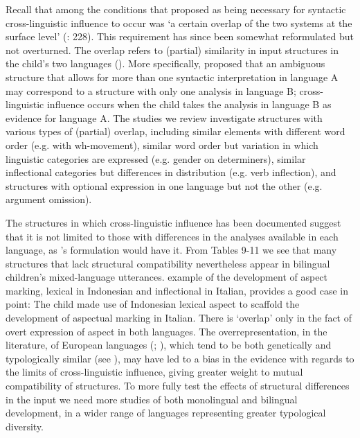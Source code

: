 \documentclass[output=paper]{langscibook}
\begin{document}
Recall that among the conditions that \citeauthor{HulkMüller2000} proposed as being necessary for syntactic cross-linguistic influence to occur was ‘a certain overlap of the two systems at the surface level’ (\citeyear{HulkMüller2000}: 228). This requirement has since been somewhat reformulated but not overturned. The overlap refers to (partial) similarity in input structures in the child’s two languages (\citealt{Unsworth2003}). More specifically, \citeauthor{HulkMüller2000} proposed that an ambiguous structure that allows for more than one syntactic interpretation in language A may correspond to a structure with only one analysis in language B; cross-linguistic influence occurs when the child takes the analysis in language B as evidence for language A. The studies we review investigate structures with various types of (partial) overlap, including similar elements with different word order (e.g. with wh-movement), similar word order but variation in which linguistic categories are expressed (e.g. gender on determiners), similar inflectional categories but differences in distribution (e.g. verb inflection), and structures with optional expression in one language but not the other (e.g. argument omission).

The structures in which cross-linguistic influence has been documented suggest that it is not limited to those with differences in the analyses available in each language, as \citeauthor{HulkMüller2000}’s formulation would have it. From Tables 9-11 we see that many structures that lack structural compatibility nevertheless appear in bilingual children’s mixed-language utterances.  example of the development of aspect marking, lexical in Indonesian and inflectional in Italian, provides a good case in point: The child made use of Indonesian lexical aspect to scaffold the development of aspectual marking in Italian. There is ‘overlap’ only in the fact of overt expression of aspect in both languages. The overrepresentation, in the literature, of European languages (\citealt{Kidd2022}; \citealt{YipMatthews2022}), which tend to be both genetically and typologically similar (see \citealt{Haspelmath2001}), may have led to a bias in the evidence with regards to the limits of cross-linguistic influence, giving greater weight to mutual compatibility of structures. To more fully test the effects of structural differences in the input we need more studies of both monolingual and bilingual development, in a wider range of languages representing greater typological diversity.
\end{document}
